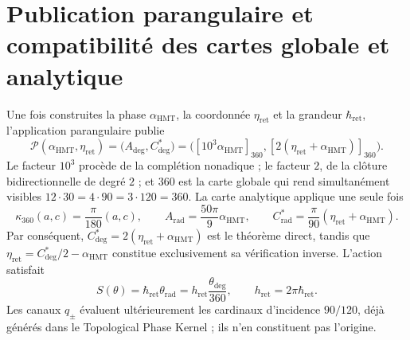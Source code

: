 \section{Publication parangulaire et compatibilité des cartes globale et analytique}
\label{sec:sucesor-102-c14-publicacion-parangular}

Une fois construites la phase \(\alpha_{\mathrm{HMT}}\), la coordonnée
\(\eta_{\mathrm{ret}}\) et la grandeur \(\hbar_{\mathrm{ret}}\), l'application
parangulaire publie
\begin{equation}
 \mathcal P(\alpha_{\mathrm{HMT}},\eta_{\mathrm{ret}})
 =\bigl(A_{\deg},C^*_{\deg}\bigr)
 =\bigl([10^3\alpha_{\mathrm{HMT}}]_{360},
        [2(\eta_{\mathrm{ret}}+\alpha_{\mathrm{HMT}})]_{360}\bigr).
 \label{eq:sucesor-102-c14-mapa-parangular}
\end{equation}
Le facteur \(10^3\) procède de la complétion nonadique ; le facteur \(2\),
de la clôture bidirectionnelle de degré \(2\) ; et \(360\) est la carte globale
qui rend simultanément visibles
\(12\cdot30=4\cdot90=3\cdot120=360\).
La carte analytique applique une seule fois
\begin{equation}
 \kappa_{360}(a,c)=\frac{\pi}{180}(a,c),
 \qquad
 A_{\mathrm{rad}}=\frac{50\pi}{9}\alpha_{\mathrm{HMT}},
 \qquad
 C^*_{\mathrm{rad}}
 =\frac{\pi}{90}(\eta_{\mathrm{ret}}+\alpha_{\mathrm{HMT}}).
 \label{eq:sucesor-102-c14-cartas}
\end{equation}
Par conséquent,
\(C^*_{\deg}=2(\eta_{\mathrm{ret}}+\alpha_{\mathrm{HMT}})\) est le
théorème direct, tandis que
\(\eta_{\mathrm{ret}}=C^*_{\deg}/2-\alpha_{\mathrm{HMT}}\) constitue
exclusivement sa vérification inverse. L'action satisfait
\begin{equation}
 S(\theta)=\hbar_{\mathrm{ret}}\theta_{\mathrm{rad}}
 =h_{\mathrm{ret}}\frac{\theta_{\deg}}{360},
 \qquad h_{\mathrm{ret}}=2\pi\hbar_{\mathrm{ret}}.
 \label{eq:sucesor-102-c14-accion-cartas}
\end{equation}
Les canaux \(q_\pm\) évaluent ultérieurement les cardinaux d'incidence
\(90/120\), déjà générés dans le Topological Phase Kernel ; ils n'en constituent pas
l'origine.
